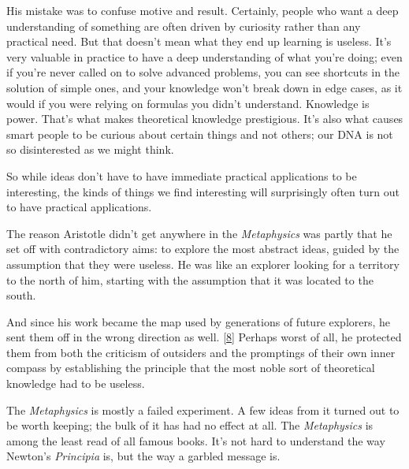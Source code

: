 His mistake was to confuse
                  motive and result. Certainly, people who want a deep
                  understanding of something are often driven by curiosity
                  rather than any practical need. But that doesn't mean what
                  they end up learning is useless. It's very valuable in
                  practice to have a deep understanding of what you're doing;
                  even if you're never called on to solve advanced problems, you
                  can see shortcuts in the solution of simple ones, and your
                  knowledge won't break down in edge cases, as it would if you
                  were relying on formulas you didn't understand. Knowledge is
                  power. That's what makes theoretical knowledge prestigious.
                  It's also what causes smart people to be curious about certain
                  things and not others; our DNA is not so disinterested as we
                  might think.

So while ideas don't have to have
                  immediate practical applications to be interesting, the kinds
                  of things we find interesting will surprisingly often turn out
                  to have practical applications.

The reason
                  Aristotle didn't get anywhere in the \emph{Metaphysics} was
                  partly that he set off with contradictory aims: to explore the
                  most abstract ideas, guided by the assumption that they were
                  useless. He was like an explorer looking for a territory to
                  the north of him, starting with the assumption that it was
                  located to the south.

And since his work became the
                  map used by generations of future explorers, he sent them off
                  in the wrong direction as well.
                  [\href{\#f8n}{8}]
                  Perhaps worst of all, he protected them from both the
                  criticism of outsiders and the promptings of their own inner
                  compass by establishing the principle that the most noble sort
                  of theoretical knowledge had to be useless.

The
                  \emph{Metaphysics} is mostly a failed experiment. A few ideas
                  from it turned out to be worth keeping; the bulk of it has had
                  no effect at all. The \emph{Metaphysics} is among the least
                  read of all famous books. It's not hard to understand the way
                  Newton's \emph{Principia} is, but the way a garbled message
                  is.

